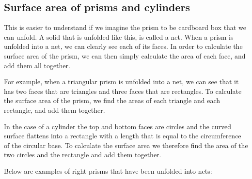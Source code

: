 \subsection{Surface area of prisms and cylinders}

This is easier to understand if we imagine the prism to be cardboard box that we can unfold.
A solid that is unfolded like this, is called a net. When a prism is unfolded into a net, we can clearly see each of its faces. In order to calculate the surface area of the prism, we can then simply calculate the area of each face, and add them all together.
\par 
{}

 For example, when a triangular prism is unfolded into a net, we can see that it has two faces that are
triangles and three faces that are rectangles. To calculate the surface area of the prism, we find the areas of each triangle and  each rectangle, and add them together.
  \par
In the case of a cylinder the top and bottom faces are circles and the curved surface flattens
into a rectangle with a length that is equal to the circumference of the circular base. To calculate the surface area we therefore find the area of the two circles and the rectangle and add them together.

\par
Below are examples of right prisms that have been unfolded into nets:

